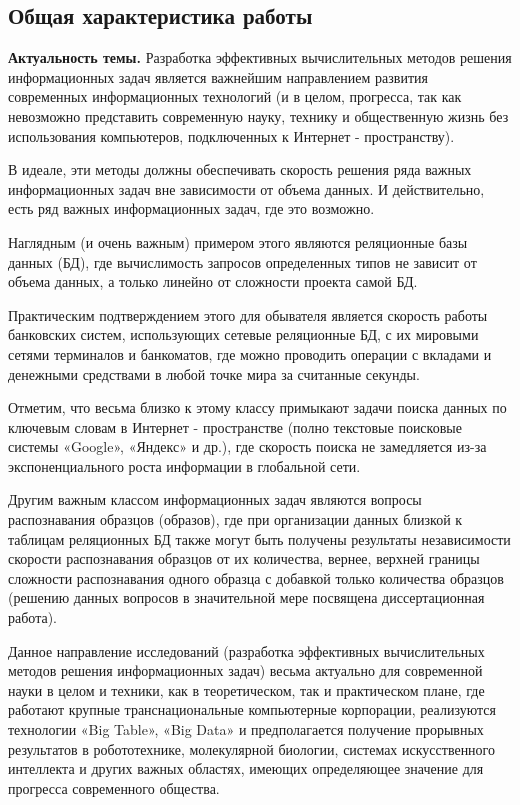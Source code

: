  \setlength{\footskip}{1cm} 

\subsection*{\Large Общая характеристика работы}
\fontsize{14pt}{15pt}\selectfont

\textbf{Актуальность темы.}  Разработка эффективных вычислительных  методов решения информационных задач является важнейшим направлением развития современных информационных технологий (и в целом, прогресса, так как невозможно представить современную науку,  технику  и общественную жизнь без использования компьютеров, подключенных к Интернет - пространству). 

В идеале, эти методы должны обеспечивать скорость решения ряда важных информационных задач вне зависимости от объема данных. И действительно, есть ряд важных  информационных задач, где это возможно. 

Наглядным (и очень важным) примером  этого являются реляционные базы данных (БД), где вычислимость запросов определенных типов не зависит от объема данных, а только линейно от сложности проекта самой БД.

Практическим подтверждением этого для обывателя является скорость работы банковских систем, использующих сетевые реляционные БД,  с их мировыми сетями терминалов и банкоматов, где можно проводить операции с вкладами и денежными средствами в любой точке мира за считанные секунды.

Отметим, что весьма близко к этому классу  примыкают задачи поиска данных по ключевым словам в Интернет - пространстве (полно текстовые поисковые системы «Google», «Яндекс» и др.), где скорость поиска не замедляется из-за экспоненциального роста информации в глобальной сети.

Другим  важным классом информационных задач являются вопросы распознавания  образцов (образов), где при организации данных близкой к таблицам реляционных БД также могут быть получены результаты независимости скорости  распознавания  образцов от их количества, вернее, верхней границы сложности распознавания одного образца с добавкой только количества образцов (решению данных вопросов в значительной мере посвящена диссертационная работа). 

Данное направление исследований (разработка эффективных вычислительных  методов решения информационных задач) весьма актуально для современной  науки в целом и техники, как в теоретическом, так и  практическом плане, где работают крупные транснациональные компьютерные корпорации, реализуются технологии «Big Table»,  «Big Data» и предполагается получение прорывных результатов в робототехнике, молекулярной биологии, системах искусственного интеллекта и других важных областях, имеющих определяющее значение для прогресса современного общества.

